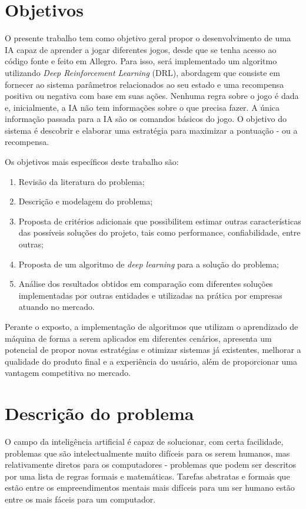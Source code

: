 \section{Objetivos}
 O presente trabalho tem como objetivo geral propor o desenvolvimento de uma IA capaz de aprender a jogar diferentes jogos, desde que se tenha acesso ao código fonte e feito em Allegro. Para isso, será implementado um algoritmo utilizando \textit{Deep Reinforcement Learning} (DRL), abordagem que consiste em fornecer ao sistema parâmetros relacionados ao seu estado e uma recompensa positiva ou negativa com base em suas ações. 
 Nenhuma regra sobre o jogo é dada e, inicialmente, a IA não tem informações sobre o que precisa fazer. A única informação passada para a IA são os comandos básicos do jogo. 
 O objetivo do sistema é descobrir e elaborar uma estratégia para maximizar a pontuação - ou a recompensa.

 Os objetivos mais específicos deste trabalho são:
 \begin{enumerate}
 	\item Revisão da literatura do problema;
 	\item Descrição e modelagem do problema;
 	\item Proposta de critérios adicionais que possibilitem estimar outras características das possíveis soluções do projeto, tais como performance, confiabilidade, entre outras;
 	\item Proposta de um algoritmo de \textit{deep learning} para a solução do problema;
 	\item Análise dos resultados obtidos em comparação com diferentes soluções implementadas por outras entidades e utilizadas na prática por empresas atuando no mercado.
 \end{enumerate}

 Perante o exposto, a implementação de algoritmos que utilizam o aprendizado de máquina de forma a serem aplicados em diferentes cenários,
 apresenta um potencial de propor novas estratégias e otimizar sistemas já existentes, melhorar a qualidade do produto final e a experiência do usuário, além de proporcionar uma vantagem competitiva no mercado.

\section{Descrição do problema}
\label{sec:descricao_do_problema}
O campo da inteligência artificial é capaz de solucionar, com certa facilidade, problemas que são intelectualmente muito difíceis para os serem humanos, mas relativamente diretos para os computadores - problemas que podem ser descritos por uma lista de regras formais e matemáticas. Tarefas abstratas e formais que estão entre os empreendimentos mentais mais difíceis para um ser humano estão entre os mais fáceis para um computador.

